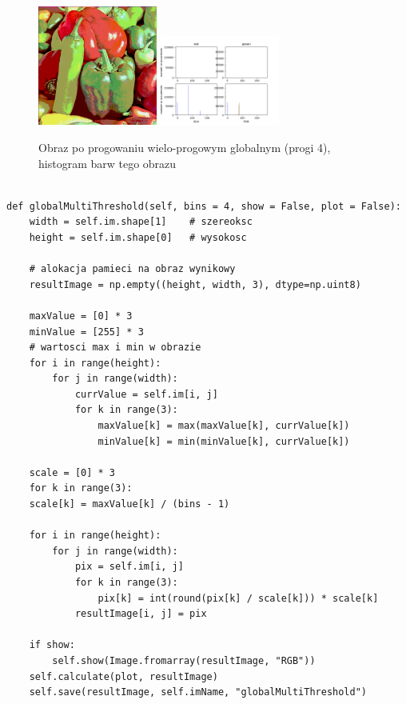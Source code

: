 \documentclass[final,a4paper,openany,12pt]{mwbk}
\begin{document}
\begin{figure}[H]
	\begin{center}
		\includegraphics[width=0.35\textwidth]{peppers_color_globalMultiThreshold_result}
		\includegraphics[width=0.35\textwidth]{peppers_color_globalMultiThreshold_histogram}
	\end{center}
	\caption{Obraz po progowaniu wielo-progowym globalnym (progi 4), histogram barw tego obrazu}
\end{figure}




\begin{lstlisting}[caption=Progowanie wielo-progowe globalne]
	
def globalMultiThreshold(self, bins = 4, show = False, plot = False):
	width = self.im.shape[1]    # szereoksc
	height = self.im.shape[0]   # wysokosc
	
	# alokacja pamieci na obraz wynikowy
	resultImage = np.empty((height, width, 3), dtype=np.uint8)
	
	maxValue = [0] * 3
	minValue = [255] * 3
	# wartosci max i min w obrazie
	for i in range(height):
		for j in range(width):
			currValue = self.im[i, j]
			for k in range(3):
				maxValue[k] = max(maxValue[k], currValue[k])
				minValue[k] = min(minValue[k], currValue[k])
	
	scale = [0] * 3
	for k in range(3):
	scale[k] = maxValue[k] / (bins - 1)
	
	for i in range(height):
		for j in range(width):
			pix = self.im[i, j]
			for k in range(3):
				pix[k] = int(round(pix[k] / scale[k])) * scale[k]
			resultImage[i, j] = pix
	
	if show:
		self.show(Image.fromarray(resultImage, "RGB"))
	self.calculate(plot, resultImage)
	self.save(resultImage, self.imName, "globalMultiThreshold")
	
\end{lstlisting}
\end{document}
